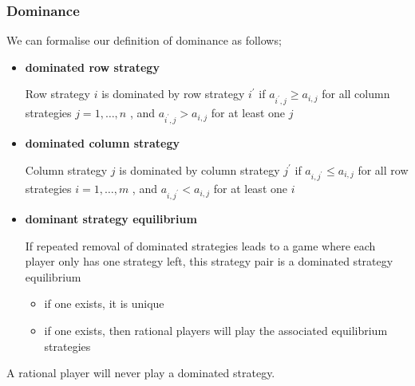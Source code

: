 \documentclass[a4paper, 12pt]{article}
\begin{document}
            \subsubsection*{Dominance}
                We can formalise our definition of dominance as follows;
                \begin{itemize}
                    \itemsep0em
                    \item \textbf{dominated row strategy}
                        \smallskip

                        Row strategy $i$ is dominated by row strategy $i^\prime$ if $a_{i^\prime, j} \geq a_{i, j}$ for all column strategies $j = 1, \dots, n$ , and $a_{i^\prime, j} > a_{i, j}$ for at least one $j$
                    \item \textbf{dominated column strategy}
                        \smallskip

                        Column strategy $j$ is dominated by column strategy $j^\prime$ if $a_{i, j^\prime} \leq a_{i, j}$ for all row strategies $i = 1, \dots, m$ , and $a_{i, j^\prime} < a_{i, j}$ for at least one $i$
                    \item \textbf{dominant strategy equilibrium}
                        \smallskip

                        If repeated removal of dominated strategies leads to a game where each player only has one strategy left, this strategy pair is a dominated strategy equilibrium
                        \begin{itemize}
                            \itemsep0em
                            \item if one exists, it is unique
                            \item if one exists, then rational players will play the associated equilibrium strategies
                        \end{itemize}
                \end{itemize}
                A rational player will never play a dominated strategy.
\end{document}
